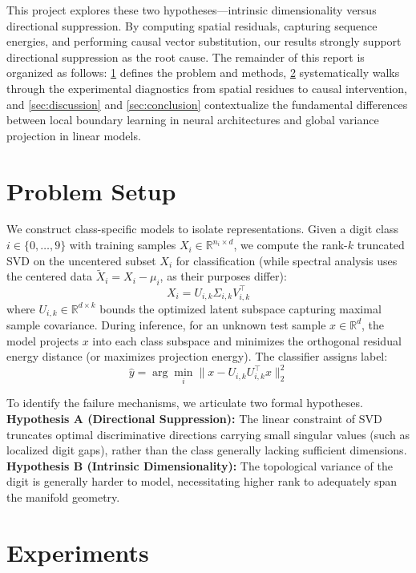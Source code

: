 \documentclass[11pt, a4paper]{article}
\begin{document}
This project explores these two hypotheses—intrinsic dimensionality versus directional suppression. By computing spatial residuals, capturing sequence energies, and performing causal vector substitution, our results strongly support directional suppression as the root cause. The remainder of this report is organized as follows: \cref{sec:setup} defines the problem and methods, \cref{sec:experiments} systematically walks through the experimental diagnostics from spatial residues to causal intervention, and \cref{sec:discussion} and \cref{sec:conclusion} contextualize the fundamental differences between local boundary learning in neural architectures and global variance projection in linear models.

\section{Problem Setup}
\label{sec:setup}
We construct class-specific models to isolate representations. Given a digit class $i \in \{0, \dots, 9\}$ with training samples $X_i \in \mathbb{R}^{n_i \times d}$, we compute the rank-$k$ truncated SVD on the uncentered subset $X_i$ for classification (while spectral analysis uses the centered data $\tilde{X}_i = X_i - \mu_i$, as their purposes differ):
\[
  X_i = U_{i, k} \Sigma_{i, k} V_{i, k}^\top
\]
where $U_{i, k} \in \mathbb{R}^{d \times k}$ bounds the optimized latent subspace capturing maximal sample covariance. During inference, for an unknown test sample $x \in \mathbb{R}^d$, the model projects $x$ into each class subspace and minimizes the orthogonal residual energy distance (or maximizes projection energy). The classifier assigns label:
\[
  \hat{y} = \arg\min_i \| x - U_{i, k} U_{i, k}^\top x \|_2^2
\]

To identify the failure mechanisms, we articulate two formal hypotheses. \textbf{Hypothesis A (Directional Suppression):} The linear constraint of SVD truncates optimal discriminative directions carrying small singular values (such as localized digit gaps), rather than the class generally lacking sufficient dimensions. \textbf{Hypothesis B (Intrinsic Dimensionality):} The topological variance of the digit is generally harder to model, necessitating higher rank to adequately span the manifold geometry. 

\section{Experiments}
\label{sec:experiments}
\end{document}
